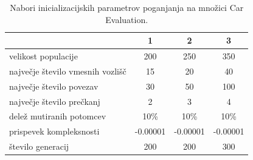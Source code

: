\begin{table}[H]
    \begin{center}
        \begin{tabular}{||l c c c||}
            \hline
            & 1        & 2        & 3 \\ [0.5ex]
            \hline
            velikost populacije               & 200      & 250      & 350      \\
            \hline
            največje število vmesnih vozlišč & 15       & 20       & 40       \\
            \hline
            največje število povezav          & 30       & 50       & 100      \\
            \hline
            največje število prečkanj         & 2        & 3        & 4        \\
            \hline
            delež mutiranih potomcev          & 10\%     & 10\%     & 10\%     \\
            \hline
            prispevek kompleksnosti           & -0.00001 & -0.00001 & -0.00001 \\
            \hline
            število generacij                 & 200      & 200      & 300      \\
            \hline
        \end{tabular}
    \end{center}
    \caption{Nabori inicializacijskih parametrov poganjanja na množici Car Evaluation.}
    \label{tab:param_car}
\end{table}

